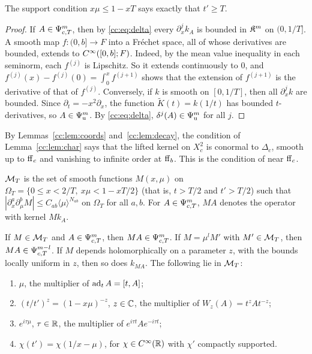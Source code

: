 The support condition \(x\mu\le1-xT\) says exactly that \(t'\ge T\).

\begin{proof}
If \(A\in\Psi_{c,T}^m\), then by \eqref{cc:eq:delta} every
\(\partial_x^jk_A\) is bounded in \(\mathfrak K^m\) on \((0,1/T]\). A smooth map
\(f:(0,b]\to F\) into a Fr\'echet space, all of whose derivatives are
bounded, extends to \(C^\infty([0,b];F)\). Indeed, by the mean value inequality
in each seminorm, each \(f^{(j)}\) is Lipschitz. So it extends
continuously to \(0\), and \(f^{(j)}(x)-f^{(j)}(0)=\int_0^xf^{(j+1)}\)
shows that the extension of \(f^{(j+1)}\) is the derivative of that of
\(f^{(j)}\). Conversely, if \(k\) is smooth on \([0,1/T]\), then all
\(\partial_x^jk\) are bounded. Since \(\partial_t=-x^2\partial_x\), the
function \(\widetilde K(t)=k(1/t)\) has bounded \(t\)-derivatives, so
\(A\in\Psi_{\mathrm u}^m\). By \eqref{cc:eq:delta}, \(\delta^j(A)\in\Psi_{\mathrm u}^m\) for all
\(j\).
\end{proof}

By Lemmas~\ref{cc:lem:coords} and~\ref{cc:lem:decay}, the condition
of Lemma~\ref{cc:lem:char} says that the lifted kernel on \(X_c^2\) is
conormal to \(\Delta_c\), smooth up to \(\mathrm{ff}_c\) and vanishing to infinite
order at \(\mathrm{ff}_b\). This is the condition of \cite[Def.~2]{MN} near
\(\mathrm{ff}_c\).

\begin{definition}[Multipliers]\label{cc:def:mult}
\(\mathcal M_T\) is the set of smooth functions \(M(x,\mu)\) on
\(\Omega_T=\{0\le x<2/T,\ x\mu<1-xT/2\}\) (that is, \(t>T/2\) and
\(t'>T/2\)) such that \(|\partial_x^a\partial_\mu^bM|\le
C_{ab}\langle\mu\rangle^{N_{ab}}\) on \(\Omega_T\) for all \(a,b\). For
\(A\in\Psi_{c,T}^m\), \(MA\) denotes the operator with kernel \(Mk_A\).
\end{definition}

\begin{lemma}[Multipliers]\label{cc:lem:mult}
If \(M\in\mathcal M_T\) and \(A\in\Psi_{c,T}^m\), then \(MA\in\Psi_{c,T}^m\). If
\(M=\mu^lM'\) with \(M'\in\mathcal M_T\), then \(MA\in\Psi_{c,T}^{m-l}\). If \(M\)
depends holomorphically on a parameter \(z\), with the bounds locally
uniform in \(z\), then so does \(k_{MA}\). The following lie in \(\mathcal M_T\):
\begin{enumerate}
\item \(\mu\), the multiplier of \(\operatorname{ad}_t A=[t,A]\);
\item \((t/t')^z=(1-x\mu)^{-z}\), \(z\in\mathbb C\), the multiplier of
\(W_z(A)=t^zAt^{-z}\);
\item \(e^{i\tau\mu}\), \(\tau\in\mathbb R\), the multiplier of
\(e^{i\tau t}Ae^{-i\tau t}\);
\item \(\chi(t')=\chi(1/x-\mu)\), for \(\chi\in C^\infty(\mathbb R)\) with \(\chi'\)
compactly supported.
\end{enumerate}
\end{lemma}

